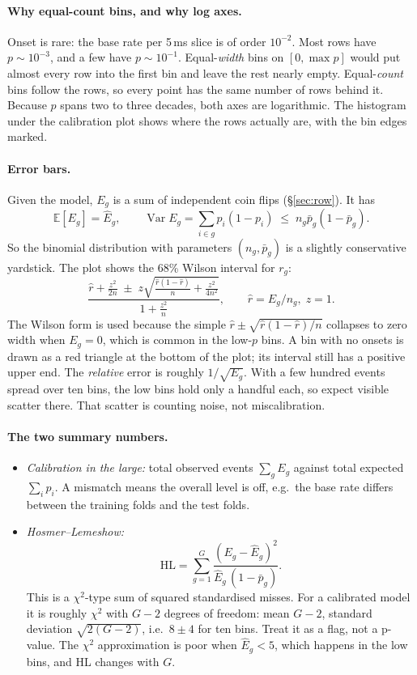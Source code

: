 \documentclass[11pt]{article}
\begin{document}
\paragraph{Why equal-count bins, and why log axes.}
Onset is rare: the base rate per 5\,ms slice is of order $10^{-2}$. Most rows
have $p\sim10^{-3}$, and a few have $p\sim10^{-1}$. Equal-\emph{width} bins on
$[0,\max p]$ would put almost every row into the first bin and leave the rest
nearly empty. Equal-\emph{count} bins follow the rows, so every point has the
same number of rows behind it. Because $p$ spans two to three decades, both
axes are logarithmic. The histogram under the calibration plot shows where the
rows actually are, with the bin edges marked.

\paragraph{Error bars.}
Given the model, $E_g$ is a sum of independent coin flips
(\S\ref{sec:row}). It has
\[
\mathbb E[E_g]=\hat E_g, \qquad \operatorname{Var}E_g=\sum_{i\in g}p_i(1-p_i)\;\le\;n_g\bar p_g(1-\bar p_g) .
\]
So the binomial distribution with parameters $(n_g,\bar p_g)$ is a slightly
conservative yardstick. The plot shows the 68\% Wilson interval for $r_g$:
\[
\frac{\hat r+\frac{z^2}{2n}\;\pm\; z\sqrt{\frac{\hat r(1-\hat r)}{n}+\frac{z^2}{4n^2}}}{1+\frac{z^2}{n}},
\qquad \hat r = E_g/n_g,\; z=1 .
\]
The Wilson form is used because the simple $\hat r\pm\sqrt{\hat r(1-\hat r)/n}$
collapses to zero width when $E_g=0$, which is common in the low-$p$ bins. A
bin with no onsets is drawn as a red triangle at the bottom of the plot; its
interval still has a positive upper end. The \emph{relative} error is roughly
$1/\sqrt{E_g}$. With a few hundred events spread over ten bins, the low bins
hold only a handful each, so expect visible scatter there. That scatter is
counting noise, not miscalibration.

\paragraph{The two summary numbers.}
\begin{itemize}
\item \emph{Calibration in the large:} total observed events $\sum_g E_g$
  against total expected $\sum_i p_i$. A mismatch means the overall level is
  off, e.g.\ the base rate differs between the training folds and the test
  folds.
\item \emph{Hosmer--Lemeshow:}
  \[
  \mathrm{HL}=\sum_{g=1}^{G}\frac{(E_g-\hat E_g)^2}{\hat E_g\,(1-\bar p_g)} .
  \]
  This is a $\chi^2$-type sum of squared standardised misses. For a calibrated
  model it is roughly $\chi^2$ with $G-2$ degrees of freedom: mean $G-2$,
  standard deviation $\sqrt{2(G-2)}$, i.e.\ $8\pm4$ for ten bins. Treat it as a
  flag, not a p-value. The $\chi^2$ approximation is poor when $\hat E_g<5$,
  which happens in the low bins, and HL changes with $G$.
\end{itemize}
\end{document}

